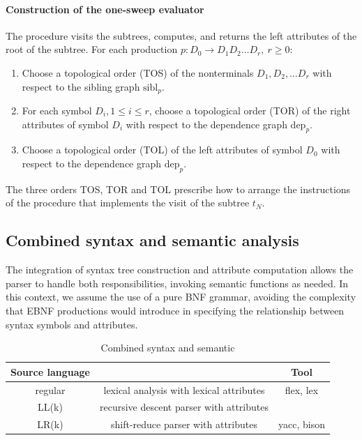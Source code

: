 \paragraph*{Construction of the one-sweep evaluator}
The procedure visits the subtrees, computes, and returns the left attributes of the root of the subtree.
For each production $p : D_0 \rightarrow D_1 D_2 \ldots D_r, \ r \geq 0$:
\begin{enumerate}
    \item Choose a topological order (TOS) of the nonterminals $D_1, D_2, \ldots  D_r$ with respect to the sibling graph $\text{sibl}_p$.
    \item For each symbol $D_i,  1 \leq i \leq r$, choose a topological order (TOR) of the right attributes of symbol $D_i$ with respect to the dependence graph $\text{dep}_p$.
    \item Choose a topological order (TOL) of the left attributes of symbol $D_0$ with respect to the dependence graph $\text{dep}_p$.
\end{enumerate}
The three orders TOS, TOR and TOL prescribe how to arrange the instructions of the procedure that implements the visit of the subtree $t_N$.

\subsection{Combined syntax and semantic analysis}
The integration of syntax tree construction and attribute computation allows the parser to handle both responsibilities, invoking semantic functions as needed. 
In this context, we assume the use of a pure BNF grammar, avoiding the complexity that EBNF productions would introduce in specifying the relationship between syntax symbols and attributes.
\begin{table}[H]
    \centering
    \begin{tabular}{c|c|c}
        \textbf{Source language}  &                                                   & \textbf{Tool}         \\ \hline
        regular                   & lexical analysis with lexical attributes          & flex, lex             \\
        LL(k)                     & recursive descent parser with attributes          &                       \\
        LR(k)                     & shift-reduce parser with attributes               & yacc, bison
    \end{tabular}
    \caption{Combined syntax and semantic}
\end{table}

